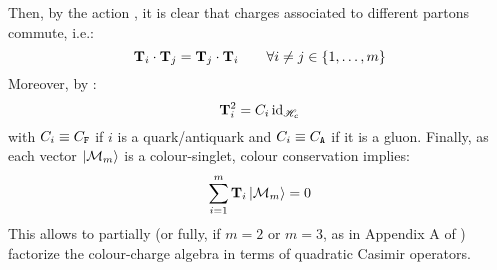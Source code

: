 Then, by the action , it is clear that charges associated to different partons commute, i.e.:
\begin{equation}
  \mathbf{T}_i \cdot \mathbf{T}_j = \mathbf{T}_j \cdot \mathbf{T}_i
  \qquad
  \forall i \neq j \in \{1, \dots, m\}
\end{equation}
Moreover, by :
\begin{equation}
  \mathbf{T}_i^2 = C_i \operatorname{id}_{\mathscr{H}_c}
\end{equation}
with $ C_i \equiv C_\mathtt{F} $ if $ i $ is a quark/antiquark and $ C_i \equiv C_\mathtt{A} $ if it is a gluon. Finally, as each vector $ \ket{\mathcal{M}_m} $ is a colour-singlet, colour conservation implies:
\begin{equation}
  \sum_{i = 1}^{m} \mathbf{T}_i \ket{\mathcal{M}_m} = 0
\end{equation}
This allows to partially (or fully, if $ m = 2 $ or $ m = 3 $, as in Appendix A of \cite{Catani-1997}) factorize the colour-charge algebra in terms of quadratic Casimir operators.










